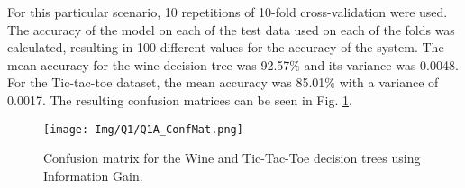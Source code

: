\documentclass{article}
\begin{document}
For this particular scenario, 10 repetitions of 10-fold cross-validation were used. The accuracy of the model on each of the test data used on each of the folds was calculated, resulting in 100 different values for the accuracy of the system. The mean accuracy for the wine decision tree was 92.57\% and its variance was 0.0048. For the Tic-tac-toe dataset, the mean accuracy was 85.01\% with a variance of 0.0017. The resulting confusion matrices can be seen in Fig. \ref{fig:Q1A_ConfMat}.

\begin{figure}[tb]
    \centering
    \texttt{[image: Img/Q1/Q1A\_ConfMat.png]}
    \caption{Confusion matrix for the Wine and Tic-Tac-Toe decision trees using Information Gain.}
    \label{fig:Q1A_ConfMat}
\end{figure}



\end{document}
